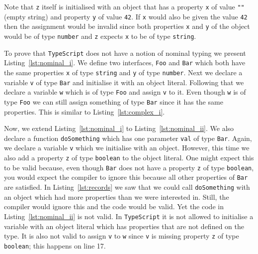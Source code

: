 \documentclass{article}
\newcommand{\ttt}[1]{\texttt{#1}}
\begin{document}
Note that \ttt{z} itself is initialised with an object that has a property \ttt{x} of value \ttt{""} (empty string) and property \ttt{y} of value \ttt{42}.
If \ttt{x} would also be given the value \ttt{42} then the assignment would be invalid since both properties \ttt{x} and \ttt{y} of the object would be of type \ttt{number} and \ttt{z} expects \ttt{x} to be of type \ttt{string}.

\begin{center}
    \begin{minipage}{.75\textwidth}
    
    \end{minipage}
\end{center}
To prove that \ttt{TypeScript} does not have a notion of nominal typing we present Listing~\ref{lst:nominal_i}.
We define two interfaces, \ttt{Foo} and \ttt{Bar} which both have the same properties \ttt{x} of type \ttt{string} and \ttt{y} of type \ttt{number}.
Next we declare a variable \ttt{v} of type \ttt{Bar} and initialise it with an object literal.
Following that we declare a variable \ttt{w} which is of type \ttt{Foo} and assign \ttt{v} to it.
Even though \ttt{w} is of type \ttt{Foo} we can still assign something of type \ttt{Bar} since it has the same properties.
This is similar to Listing~\ref{lst:complex_i}.

\begin{center}
    \begin{minipage}{.75\textwidth}
    
    \end{minipage}
\end{center}
Now, we extend Listing~\ref{lst:nominal_i} to Listing~\ref{lst:nominal_ii}.
We also declare a function \ttt{doSomething} which has one parameter \ttt{val} of type \ttt{Bar}.
Again, we declare a variable \ttt{v} which we initialise with an object.
However, this time we also add a property \ttt{z} of type \ttt{boolean} to the object literal.
One might expect this to be valid because, even though \ttt{Bar} does not have a property \ttt{z} of type \ttt{boolean}, you would expect the compiler to ignore this because all other properties of \ttt{Bar} are satisfied.
In Listing~\ref{lst:records} we saw that we could call \ttt{doSomething} with an object which had more properties than we were interested in.
Still, the compiler would ignore this and the code would be valid.
Yet the code in Listing~\ref{lst:nominal_ii} is not valid.
In \ttt{TypeScript} it is not allowed to initialise a variable with an object literal which has properties that are not defined on the type.
It is also not valid to assign \ttt{v} to \ttt{w} since \ttt{v} is missing property \ttt{z} of type \ttt{boolean}; this happens on line 17. 
\end{document}
